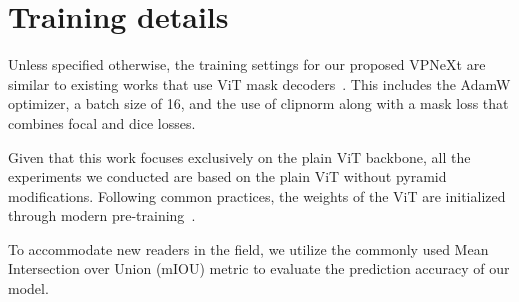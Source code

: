 \section{Training details}
\label{sec:HFGD:training_settings}

Unless specified otherwise, the training settings for our proposed VPNeXt are similar to existing works that use ViT mask decoders~\cite{cSETR,cSegViT,cMask2Former}.
This includes the AdamW optimizer, a batch size of 16, and the use of clipnorm along with a mask loss that combines focal and dice losses.

Given that this work focuses exclusively on the plain ViT backbone, all the experiments we conducted are based on the plain ViT without pyramid modifications. 
%
Following common practices, the weights of the ViT are initialized through modern pre-training~\cite{cAugReg,cEVA}.

To accommodate new readers in the field, we utilize the commonly used Mean Intersection over Union (mIOU) metric to evaluate the prediction accuracy of our model.